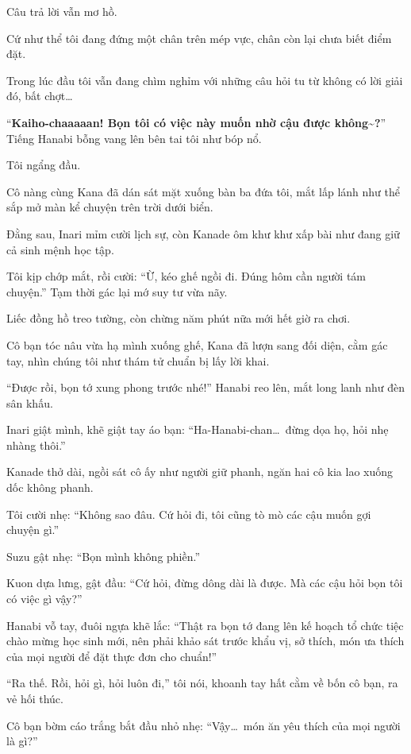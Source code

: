 \documentclass[../main.tex]{subfiles}
\begin{document}
Câu trả lời vẫn mơ hồ.

Cứ như thể tôi đang đứng một chân trên mép vực, chân còn lại chưa biết điểm đặt.

Trong lúc đầu tôi vẫn đang chìm nghỉm với những câu hỏi tu từ không có lời giải đó, bất chợt\dots

``\textbf{Kaiho-chaaaaan! Bọn tôi có việc này muốn nhờ cậu được không\~{}?}'' Tiếng Hanabi bỗng vang lên bên tai tôi như bóp nổ.

Tôi ngẩng đầu.

Cô nàng cùng Kana đã dán sát mặt xuống bàn ba đứa tôi, mắt lấp lánh như thể sắp mở màn kể chuyện trên trời dưới biển.

Đằng sau, Inari mỉm cười lịch sự, còn Kanade ôm khư khư xấp bài như đang giữ cả sinh mệnh học tập.

Tôi kịp chớp mắt, rồi cười: ``Ừ, kéo ghế ngồi đi. Đúng hôm cần người tám chuyện.'' Tạm thời gác lại mớ suy tư vừa nãy.

Liếc đồng hồ treo tường, còn chừng năm phút nữa mới hết giờ ra chơi.

Cô bạn tóc nâu vừa hạ mình xuống ghế, Kana đã lượn sang đối diện, cằm gác tay, nhìn chúng tôi như thám tử chuẩn bị lấy lời khai.

``Được rồi, bọn tớ xung phong trước nhé!'' Hanabi reo lên, mắt long lanh như đèn sân khấu.

Inari giật mình, khẽ giật tay áo bạn: ``Ha-Hanabi-chan\dots\ đừng dọa họ, hỏi nhẹ nhàng thôi.''

Kanade thở dài, ngồi sát cô ấy như người giữ phanh, ngăn hai cô kia lao xuống dốc không phanh.

Tôi cười nhẹ: ``Không sao đâu. Cứ hỏi đi, tôi cũng tò mò các cậu muốn gợi chuyện gì.''

Suzu gật nhẹ: ``Bọn mình không phiền.''

Kuon dựa lưng, gật đầu: ``Cứ hỏi, đừng dông dài là được. Mà các cậu hỏi bọn tôi có việc gì vậy?''

Hanabi vỗ tay, đuôi ngựa khẽ lắc: ``Thật ra bọn tớ đang lên kế hoạch tổ chức tiệc chào mừng học sinh mới, nên phải khảo sát trước khẩu vị, sở thích, món ưa thích của mọi người để đặt thực đơn cho chuẩn!''

``Ra thế. Rồi, hỏi gì, hỏi luôn đi,'' tôi nói, khoanh tay hất cằm về bốn cô bạn, ra vẻ hối thúc.

\il

Cô bạn bờm cáo trắng bắt đầu nhỏ nhẹ: ``Vậy\dots\ món ăn yêu thích của mọi người là gì?''
\end{document}
